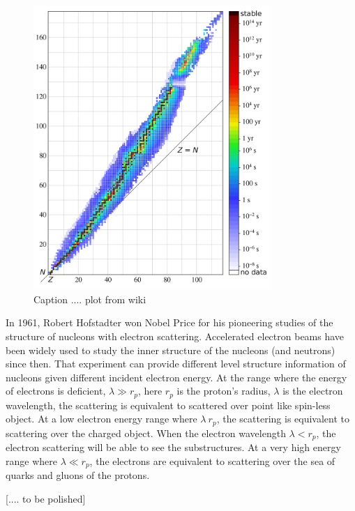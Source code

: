 \begin{figure}
    \centering
    \includegraphics[width=0.8\textwidth]{images/chap1/Isotopes_and_half-life.svg.png}
    \caption{Caption .... plot from wiki}
    \label{fig:isotopes_proton_neutron_ratio}
\end{figure}


In 1961, Robert Hofstadter won Nobel Price for his pioneering studies of the structure of nucleons with electron scattering. Accelerated electron beams have been widely used to study the inner structure of the nucleons (and neutrons) since then. That experiment can provide different level structure information of nucleons given different incident electron energy. At the range where the energy of electrons is deficient, $\lambda \gg r_p$, here $r_p$ is the proton's radius, $\lambda$ is the electron wavelength, the scattering is equivalent to scattered over point like spin-less object. At a low electron energy range where $\lambda ~r_p$, the scattering is equivalent to scattering over the charged object. When the electron wavelength $\lambda < r_p$, the electron scattering will be able to see the substructures. At a very high energy range where $\lambda \ll r_p$, the electrons are equivalent to scattering over the sea of quarks and gluons of the protons. 

[.... to be polished]

